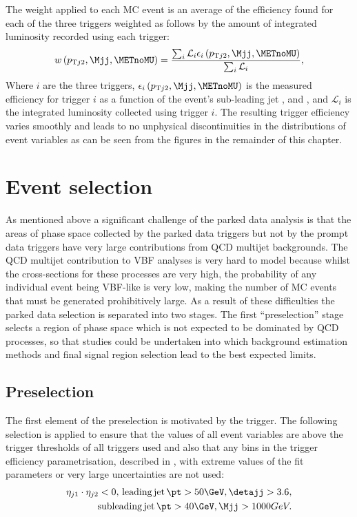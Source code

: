 The weight applied to each \ac{MC} event is an average of the efficiency found for each of the three triggers weighted as follows by the amount of integrated luminosity recorded using each trigger:
\begin{equation}
  \label{eq:parkedtrigweight}
  w\left(p_{\mathrm{T}j2},\Mjj,\METnoMU\right)=\frac{\sum_{i}\mathcal{L}_{i}\epsilon_{i}\left(p_{\mathrm{T}j2},\Mjj,\METnoMU\right)}{\sum_{i}\mathcal{L}_{i}},
\end{equation}
Where $i$ are the three triggers, $\epsilon_{i}\left(p_{\mathrm{T}j2},\Mjj,\METnoMU\right)$ is the measured efficiency for trigger $i$ as a function of the event's sub-leading jet \pt, \Mjj and \METnoMU, and $\mathcal{L}_{i}$ is the integrated luminosity collected using trigger $i$. The resulting trigger efficiency varies smoothly and leads to no unphysical discontinuities in the distributions of event variables as can be seen from the figures in the remainder of this chapter.

\section{Event selection}%
\label{sec:parkedsel}
As mentioned above a significant challenge of the parked data analysis is that the areas of phase space collected by the parked data triggers but not by the prompt data triggers have very large contributions from \ac{QCD} multijet backgrounds. The \ac{QCD} multijet contribution to \ac{VBF} analyses is very hard to model because whilst the cross-sections for these processes are very high, the probability of any individual event being \ac{VBF}-like is very low, making the number of \ac{MC} events that must be generated prohibitively large. As a result of these difficulties the parked data selection is separated into two stages. The first ``preselection'' stage selects a region of phase space which is not expected to be dominated by \ac{QCD} processes, so that studies could be undertaken into which background estimation methods and final signal region selection lead to the best expected limits.

\subsection{Preselection}%
\label{sec:parkedpresel}
The first element of the preselection is motivated by the trigger. The following selection is applied to ensure that the values of all event variables are above the trigger thresholds of all triggers used and also that any bins in the trigger efficiency parametrisation, described in , with extreme values of the fit parameters or very large uncertainties are not used:
\begin{align}
  \label{sec:parkedprepresel}
  \begin{split}
  \eta_{j1}\cdot\eta_{j2}<0,\,\mathrm{leading\,jet\,}\pt>50 \GeV, \detajj>3.6, \\
  \mathrm{subleading\,jet\,}\pt>40 \GeV, \Mjj>1000 GeV.
  \end{split}
\end{align}



